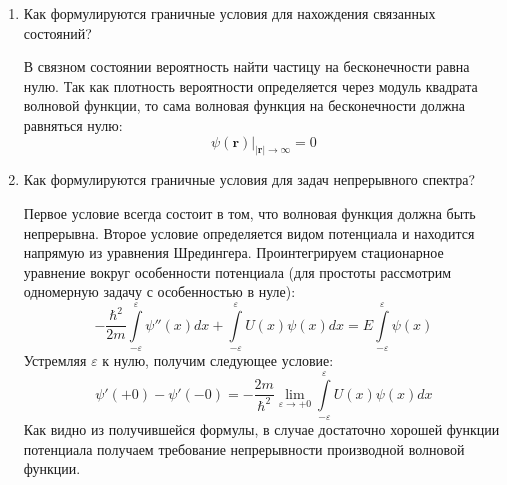 \documentclass{article}
\begin{document}
\begin{enumerate}
	\item {Как формулируются граничные условия для нахождения связанных состояний?}
	
	В связном состоянии вероятность найти частицу на бесконечности равна нулю. Так как плотность вероятности определяется через модуль квадрата волновой функции, то сама волновая функция на бесконечности должна равняться нулю:
	\begin{equation}
		\left.\psi(\textbf{r})\right|_{|\textbf{r}| \to \infty} = 0
	\end{equation}
	
	\item {Как формулируются граничные условия для задач непрерывного спектра?}
	
	Первое условие всегда состоит в том, что волновая функция должна быть непрерывна. Второе условие определяется видом потенциала и находится напрямую из уравнения Шредингера. Проинтегрируем стационарное уравнение вокруг особенности потенциала (для простоты рассмотрим одномерную задачу с особенностью в нуле):
	\begin{equation}
		-\frac{\hbar^2}{2m}\int\limits_{-\varepsilon}^{\varepsilon}\psi''(x)dx + \int\limits_{-\varepsilon}^{\varepsilon} U(x)\psi(x)dx = E\int\limits_{-\varepsilon}^{\varepsilon}\psi(x)
	\end{equation}
	Устремляя $\varepsilon$ к нулю, получим следующее условие:
	\begin{equation}
		\psi'(+0) - \psi'(-0) = -\frac{2m}{\hbar^2} \lim_{\varepsilon \to +0}\int\limits_{-\varepsilon}^{\varepsilon} U(x)\psi(x)dx
	\end{equation}
	Как видно из получившейся формулы, в случае достаточно хорошей функции потенциала получаем требование непрерывности производной волновой функции.

\end{enumerate}
\end{document}
